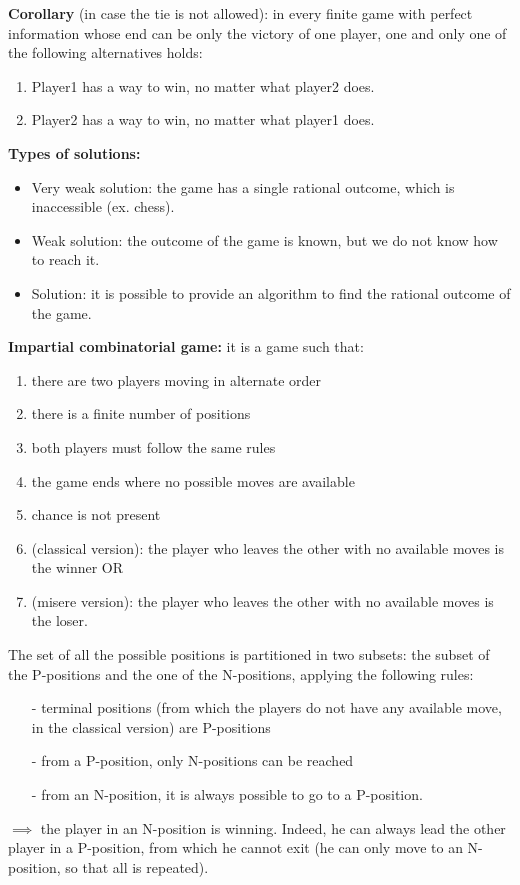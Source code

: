 \bigskip
\noindent \textbf{Corollary} (in case the tie is not allowed): in every finite 
game with perfect information whose end can be only the victory of one player, 
one and only one of the following alternatives holds:
\begin{enumerate}
	\item Player1 has a way to win, no matter what player2 does.
	\item Player2 has a way to win, no matter what player1 does.
\end{enumerate}

\bigskip
\noindent \textbf{Types of solutions:}
\begin{itemize}
	\item Very weak solution: the game has a single rational outcome, which is 
	inaccessible (ex. chess).
	\item Weak solution: the outcome of the game is known, but we do not know 
	how to reach it.
	\item Solution: it is possible to provide an algorithm to find the rational 
	outcome of the game.
\end{itemize}

\bigskip
\noindent \textbf{Impartial combinatorial game:} it is a game such that:
\begin{enumerate}
	\item there are two players moving in alternate order
	\item there is a finite number of positions
	\item both players must follow the same rules
	\item the game ends where no possible moves are available
	\item chance is not present
	\item (classical version): the player who leaves the other with no 
	available moves is the winner OR
	\item (misere version): the player who leaves the other with no 
	available moves is the loser.
\end{enumerate}
The set of all the possible positions is partitioned in two subsets: the 
subset of the P-positions and the one of the N-positions, applying the following 
rules:
\begin{itemize}
	\item[-] terminal positions (from which the players do not have any 
	available move, in the classical version) are P-positions
	\item[-] from a P-position, only N-positions can be reached
	\item[-] from an N-position, it is always possible to go to a P-position.
\end{itemize}
$\implies$ the player in an N-position is winning. Indeed, he can always lead 
the other player in a P-position, from which he cannot exit (he can only move 
to an N-position, so that all is repeated).

